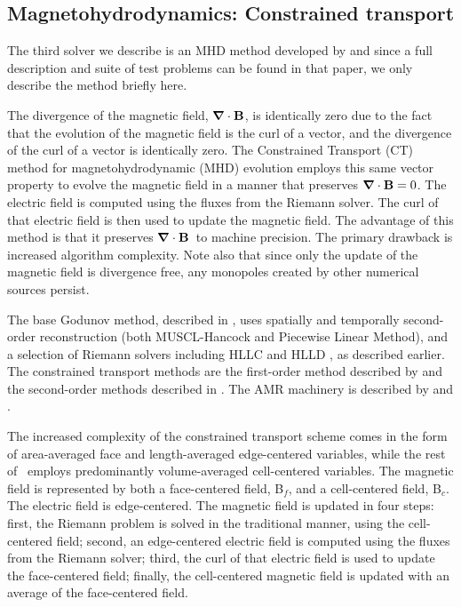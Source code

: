 \subsection{Magnetohydrodynamics: Constrained transport}
\label{sec.num.mhd-ct}
\def\Bvec{{\bf B}}
\def\Bf{Bf}
\def\Bc{Bc}
\def\Evec{{\bf E}}
\def\Divb{\ensuremath{\div \Bvec}}

The third solver we describe is an MHD method developed by 
\citet{Collins10} and since a full description and suite of test problems can be
found in that paper, we only describe the method briefly here.

The divergence of the magnetic field, \Divb, is
identically zero due to the fact that the evolution of the magnetic field is the
curl of a vector, and the divergence of the curl of a vector is identically
zero.
The Constrained Transport (CT) method \citep{Evans88, Balsara99} for
magnetohydrodynamic (MHD) evolution employs this same vector property
to evolve the magnetic field in a manner that preserves $\Divb=0$.  
The electric field is computed using
the fluxes from the Riemann solver.  The curl of that electric field
is then used to update the magnetic field.  The advantage of this
method is that it preserves \Divb\ to machine precision.  The primary
drawback is increased algorithm complexity.  Note also that since 
only the update of the magnetic field is divergence free, any monopoles 
created by other numerical sources persist.

The base Godunov method, described in \citet{Li08a}, uses spatially and
temporally second-order reconstruction (both MUSCL-Hancock and
Piecewise Linear Method), and a selection of Riemann solvers including
HLLC and HLLD \citep{Mignone07}, as described earlier.  
The constrained transport methods
are the first-order method described by \citet{Balsara99} and the
second-order methods described in \citet{Gardiner05}.  The AMR
machinery is described by \citet{Balsara01} and \citet{Collins10}.

The increased complexity of the constrained transport scheme comes in
the form of area-averaged face and length-averaged edge-centered
variables, while the rest of \enzo\ employs predominantly
volume-averaged cell-centered variables.  The magnetic field is
represented by both a face-centered field, B$_f$, and a cell-centered
field, B$_c$.  The electric field is edge-centered.  The magnetic
field is updated in four steps: first, the Riemann problem is solved
in the traditional manner, using the cell-centered field; second, an
edge-centered electric field is computed using the fluxes from the
Riemann solver; third, the curl of that electric field is used to
update the face-centered field; finally, the cell-centered magnetic
field is updated with an average of the face-centered field.

